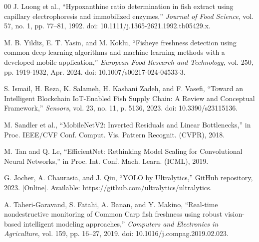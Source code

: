 \documentclass[conference]{IEEEtran}
\begin{document}
\begin{thebibliography}{00}
J. Luong et al., ``Hypoxanthine ratio determination in fish extract using capillary electrophoresis and immobilized enzymes,'' \textit{Journal of Food Science}, vol. 57, no. 1, pp. 77--81, 1992. doi: 10.1111/j.1365-2621.1992.tb05429.x.

M. B. Yildiz, E. T. Yasin, and M. Koklu, ``Fisheye freshness detection using common deep learning algorithms and machine learning methods with a developed mobile application,'' \textit{European Food Research and Technology}, vol. 250, pp. 1919-1932, Apr. 2024. doi: 10.1007/s00217-024-04533-3.

S. Ismail, H. Reza, K. Salameh, H. Kashani Zadeh, and F. Vasefi, ``Toward an Intelligent Blockchain IoT-Enabled Fish Supply Chain: A Review and Conceptual Framework,'' \textit{Sensors}, vol. 23, no. 11, p. 5136, 2023. doi: 10.3390/s23115136.

M. Sandler et al.,
``MobileNetV2: Inverted Residuals and Linear Bottlenecks,''
in Proc. IEEE/CVF Conf. Comput. Vis. Pattern Recognit. (CVPR), 2018.

M. Tan and Q. Le,
``EfficientNet: Rethinking Model Scaling for Convolutional Neural Networks,''
in Proc. Int. Conf. Mach. Learn. (ICML), 2019.

G. Jocher, A. Chaurasia, and J. Qiu,
``YOLO by Ultralytics,''
GitHub repository, 2023.
[Online]. Available: https://github.com/ultralytics/ultralytics.

A. Taheri-Garavand, S. Fatahi, A. Banan, and Y. Makino,
``Real-time nondestructive monitoring of Common Carp fish freshness using robust vision-based intelligent modeling approaches,''
\textit{Computers and Electronics in Agriculture},
vol. 159, pp. 16--27, 2019.
doi: 10.1016/j.compag.2019.02.023.

\end{thebibliography}
\end{document}
